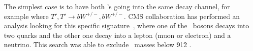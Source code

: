 The simplest case is to have both \Tp's going into the same decay channel, for example where ${T',T'\rightarrow bW^{+/-},bW^{+/-}}$. CMS collaboration has performed an analysis looking for this specific signature~\cite{CMS-PAS-B2G-12-017}, where one of the \W~bosons decays into two quarks and the other one decay into a lepton (muon or electron) and a neutrino. This search was able to exclude \Tp~masses below 912 \GeVcc.
%

